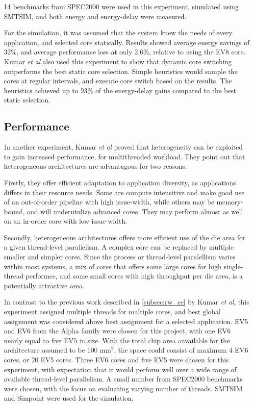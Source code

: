14 benchmarks from SPEC2000 were used in this experiment, simulated using SMTSIM, and both energy and energy-delay were measured.

For the simulation, it was assumed that the system knew the needs of every application, and selected core statically. 
Results showed average energy savings of 32\%, and average performance loss at only 2.6\%, relative to using the EV8 core.
Kumar \textit{et al} also used this experiment to show that dynamic core switching outperforms the best static core selection.
Simple heuristics would sample the cores at regular intervals, and execute core switch based on the results.
The heuristics achieved up to 93\% of the energy-delay gains compared to the best static selection. 

\subsection{Performance}
\label{subsec:rw_perf}
In another experiment, Kumar \textit{et al}\cite{heterogeneous-perf} proved that heterogeneity can be exploited to gain increased performance, for multithreaded workload.
They point out that heterogeneous architectures are advantagous for two reasons.

Firstly, they offer efficient adaptation to application diversity, as applications differs in their resource needs.
Some are compute intensitive and make good use of an out-of-order pipeline with high issue-width, while others may be memory-bound, and will underutulize advanced cores.
They may perform almost as well on an in-order core with low issue-width\cite{heterogeneous-perf}.

Secondly, heterogeneous architectures offers more efficient use of the die area for a given thread-level parallelism.
A complex core can be replaced by multiple smaller and simpler cores. 
Since the process or thread-level paralellism varies within most systems, a mix of cores that offers some large cores for high single-thread performce, and some small cores with high throughput per die area, is a potentially attractive area. \cite{heterogeneous-perf}

In contrast to the previous work described in \ref{subsec:rw_ee} by Kumar \textit{et al}, this experiment assigned multiple threads for multiple cores, and best global assignment was considered above best assignment for a selected application.
EV5 and EV6 from the Alpha family were chosen for this project, with one EV6 nearly equal to five EV5 in size.
With the total chip area anvailable for the architecture assumed to be 100 mm$^2$, the space could consist of maximum 4 EV6 cores, or 20 EV5 cores.
Three EV6 cores and five EV5 were chosen for this experiment, with expectation that it would perform well over a wide range of available thread-level parallelism. 
A small number from SPEC2000 benchmarks were chosen, with the focus on evaluating varying number of threads.
SMTSIM and Simpoint were used for the simulation.

